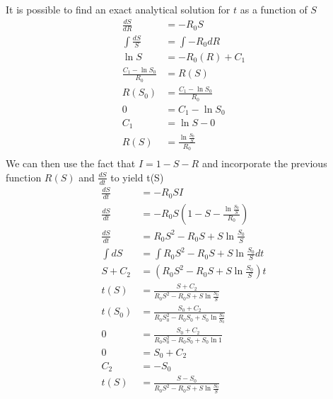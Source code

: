 It is possible to find an exact analytical solution for $t$ as a function of $S$
\begin{align*}
\frac{dS}{dR}&=-R_0S\\
\int \frac{dS}{S}&=\int -R_0dR\\
\ln{S}&=-R_0(R)+C_1\\
\frac{C_1-\ln{S_0}}{R_0}&=R(S)\\
R(S_0)&=\frac{C_1-\ln{S_0}}{R_0}\\
0&=C_1-\ln{S_0}\\
C_1&=\ln{S-0}\\
R(S)&=\frac{\ln{\frac{S_0}{S}}}{R_0}\\
\end{align*}
We can then use the fact that $I=1-S-R$ and incorporate the previous function $R(S)$ and $\frac{dS}{dt}$ to yield t(S)\\
\begin{align*}
\frac{dS}{dt}&= -R_0SI\\
\frac{dS}{dt}&=-R_0S(1-S-\frac{\ln{\frac{S_0}{S}}}{R_0})\\
\frac{dS}{dt}&=R_0S^2-R_0S+S\ln{\frac{S_0}{S}}\\
\int{dS}&=\int{R_0S^2-R_0S+S\ln{\frac{S_0}{S}}}dt\\
S+C_2&=(R_0S^2-R_0S+S\ln{\frac{S_0}{S}})t\\
t(S)&=\frac{S+C_2}{R_0S^2-R_0S+S\ln{\frac{S_0}{S}}}\\
t(S_0)&=\frac{S_0+C_2}{R_0S_0^2-R_0S_0+S_0\ln{\frac{S_0}{S_0}}}\\
0&=\frac{S_0+C_2}{R_0S_0^2-R_0S_0+S_0\ln{1}}\\
0&={S_0+C_2}\\
C_2&=-S_0\\
t(S)&=\frac{S-S_0}{R_0S^2-R_0S+S\ln{\frac{S_0}{S}}}\\
\end{align*}
